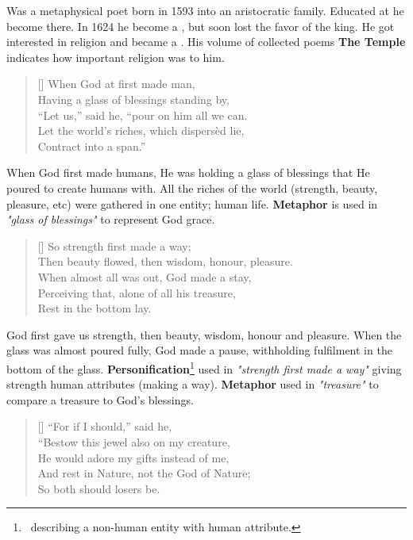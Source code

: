 
Was a metaphysical poet born in 1593 into an aristocratic family. Educated at
 he become 
 there. In 1624 he become a ,
but soon lost the favor of the king. He got interested in religion and became a .
His volume of collected poems \textbf{The Temple} indicates how important religion was to him.

\settowidth{\versewidth}{Having a glass of blessings standing by "let"}
\begin{verse}[\versewidth]
{\fontverse
When God at first made man,\\
Having a glass of blessings standing by,\\
“Let us,” said he, “pour on him all we can.\\
Let the world’s riches, which dispersèd lie,\\
Contract into a span.”
} 
\end{verse}

When God first made humans, He was holding a glass of blessings that
He poured to create humans with. All the riches of the world (strength, beauty, pleasure, etc) were gathered in 
one entity; human life. \textbf{Metaphor} is used in \textit{"glass of blessings"} to represent God grace.

\begin{verse}[\versewidth]
{\fontverse
So strength first made a way;\\
Then beauty flowed, then wisdom, honour, pleasure.\\
When almost all was out, God made a stay,\\
Perceiving that, alone of all his treasure,\\
Rest in the bottom lay.
} 
\end{verse}

God first gave us strength, then beauty, wisdom, honour and pleasure.
When the glass was almost poured fully, God made a pause, withholding 
fulfilment in the bottom of the glass. \textbf{Personification}\footnote{\,
describing a non-human entity with human attribute.}
used in \textit{"strength first made a way"} giving strength human attributes
(making a way). \textbf{Metaphor} used in \textit{"treasure"} to compare
a treasure to God's blessings.

\begin{verse}[\versewidth]
{\fontverse
“For if I should,” said he,\\
“Bestow this jewel also on my creature,\\
He would adore my gifts instead of me,\\
And rest in Nature, not the God of Nature;\\
So both should losers be.
} 
\end{verse}

